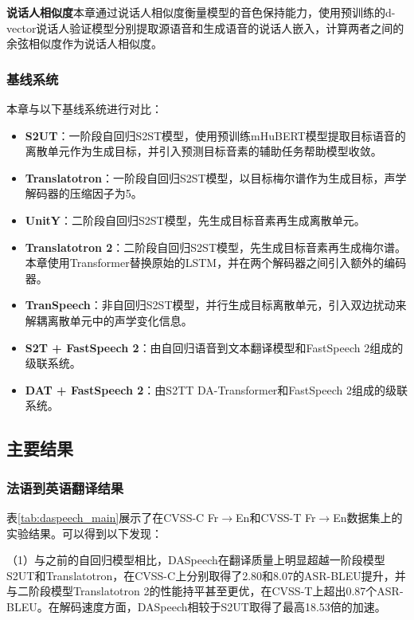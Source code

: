 \textbf{说话人相似度}\quad 本章通过说话人相似度衡量模型的音色保持能力，使用预训练的d-vector说话人验证模型\citep{dvector}分别提取源语音和生成语音的说话人嵌入，计算两者之间的余弦相似度作为说话人相似度。

\subsubsection{基线系统}

本章与以下基线系统进行对比：

\begin{itemize}
    \item \textbf{S2UT}\citep{s2ut}：一阶段自回归S2ST模型，使用预训练mHuBERT模型提取目标语音的离散单元作为生成目标，并引入预测目标音素的辅助任务帮助模型收敛。
    \item \textbf{Translatotron}\citep{translatotron}：一阶段自回归S2ST模型，以目标梅尔谱作为生成目标，声学解码器的压缩因子为5。
    \item \textbf{UnitY}\citep{inaguma-etal-2023-unity}：二阶段自回归S2ST模型，先生成目标音素再生成离散单元。
    \item \textbf{Translatotron 2}\citep{translatotron2}：二阶段自回归S2ST模型，先生成目标音素再生成梅尔谱。本章使用Transformer替换原始的LSTM，并在两个解码器之间引入额外的编码器。
    \item \textbf{TranSpeech}\citep{huang2023transpeech}：非自回归S2ST模型，并行生成目标离散单元，引入双边扰动来解耦离散单元中的声学变化信息。
    \item \textbf{S2T + FastSpeech 2}：由自回归语音到文本翻译模型和FastSpeech 2组成的级联系统。
    \item \textbf{DAT + FastSpeech 2}：由S2TT DA-Transformer和FastSpeech 2组成的级联系统。
\end{itemize}

\subsection{主要结果}

\subsubsection{法语到英语翻译结果}



表\ref{tab:daspeech_main}展示了在CVSS-C Fr$\rightarrow$En和CVSS-T Fr$\rightarrow$En数据集上的实验结果。可以得到以下发现：

（1）与之前的自回归模型相比，DASpeech在翻译质量上明显超越一阶段模型S2UT和Translatotron，在CVSS-C上分别取得了2.80和8.07的ASR-BLEU提升，并与二阶段模型Translatotron 2的性能持平甚至更优，在CVSS-T上超出0.87个ASR-BLEU。在解码速度方面，DASpeech相较于S2UT取得了最高18.53倍的加速。

